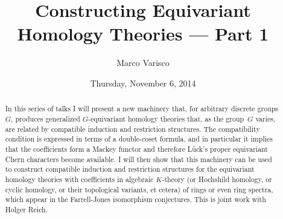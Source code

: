 \documentclass{UAmathtalk}
\author{Marco Varisco}
\title{Constructing Equivariant\\ Homology Theories --- Part 1}
\date{Thursday, November 6, 2014}
\begin{document}
\maketitle

\begin{abstract}
In this series of talks I will present a new machinery that, for arbitrary discrete groups $G$, produces generalized $G$-equivariant homology theories that, as the group~$G$ varies, are related by compatible induction and restriction structures.
The compatibility condition is expressed in terms of a double-coset formula, and in particular it implies that the coefficients form a Mackey functor and therefore L\"uck's proper equivariant Chern characters become available.
I will then show that this machinery can be used to construct compatible induction and restriction structures for the equivariant homology theories with coefficients in algebraic $K$-theory (or Hochshild homology, or cyclic homology, or their topological variants, et cetera) of rings or even ring spectra, which appear in the Farrell-Jones isomorphism conjectures.
This is joint work with Holger Reich.
\end{abstract}
\end{document}
